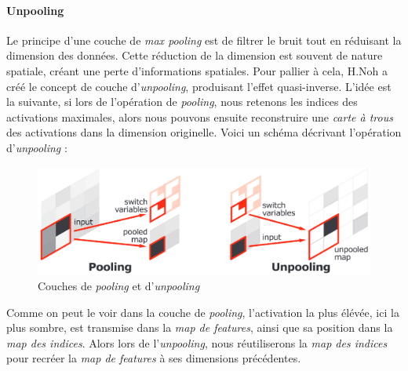\documentclass[a4paper, 11pt]{report}
\begin{document}
\paragraph{Unpooling}
Le principe d'une couche de \emph{max pooling} est de filtrer le bruit tout en réduisant la dimension des données. Cette réduction de la dimension est souvent de nature spatiale, créant une perte d'informations spatiales.
Pour pallier à cela, H.Noh a créé le concept de couche d'\emph{unpooling}, produisant l'effet quasi-inverse.
L'idée est la suivante, si lors de l'opération de \emph{pooling}, nous retenons les indices des activations maximales, alors nous pouvons ensuite reconstruire une \emph{carte à trous} des activations dans la dimension originelle.
Voici un schéma décrivant l'opération d'\emph{unpooling} :
\begin{figure}[H]
	\begin{center}
		\includegraphics[scale=0.3]{Images/Unpooling.png}
		\caption{Couches de \emph{pooling} et d'\emph{unpooling}}
	\end{center}
\end{figure}
Comme on peut le voir dans la couche de \emph{pooling}, l'activation la plus élévée, ici la plus sombre, est transmise dans la \emph{map de features}, ainsi que sa position dans la \emph{map des indices}. Alors lors de l'\emph{unpooling}, nous réutiliserons la \emph{map des indices} pour recréer la \emph{map de features} à ses dimensions précédentes.
\end{document}
